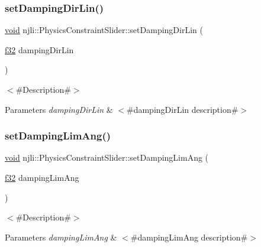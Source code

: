\subsubsection{\texorpdfstring{set\+Damping\+Dir\+Lin()}{setDampingDirLin()}}
{\footnotesize\ttfamily \mbox{\hyperlink{_thread_8h_af1e856da2e658414cb2456cb6f7ebc66}{void}} njli\+::\+Physics\+Constraint\+Slider\+::set\+Damping\+Dir\+Lin (\begin{DoxyParamCaption}\item[{\mbox{\hyperlink{_util_8h_a5f6906312a689f27d70e9d086649d3fd}{f32}}}]{damping\+Dir\+Lin }\end{DoxyParamCaption})}

$<$\#\+Description\#$>$


\begin{DoxyParams}{Parameters}
{\em damping\+Dir\+Lin} & $<$\#damping\+Dir\+Lin description\#$>$ \\
\hline
\end{DoxyParams}
\mbox{\label{classnjli_1_1_physics_constraint_slider_adfa0e530b168847156b10884457039db}} 
\subsubsection{\texorpdfstring{set\+Damping\+Lim\+Ang()}{setDampingLimAng()}}
{\footnotesize\ttfamily \mbox{\hyperlink{_thread_8h_af1e856da2e658414cb2456cb6f7ebc66}{void}} njli\+::\+Physics\+Constraint\+Slider\+::set\+Damping\+Lim\+Ang (\begin{DoxyParamCaption}\item[{\mbox{\hyperlink{_util_8h_a5f6906312a689f27d70e9d086649d3fd}{f32}}}]{damping\+Lim\+Ang }\end{DoxyParamCaption})}

$<$\#\+Description\#$>$


\begin{DoxyParams}{Parameters}
{\em damping\+Lim\+Ang} & $<$\#damping\+Lim\+Ang description\#$>$ \\
\hline
\end{DoxyParams}
\mbox{\label{classnjli_1_1_physics_constraint_slider_a8da4bf74177a1ccf1c783e2292f24008}} 
